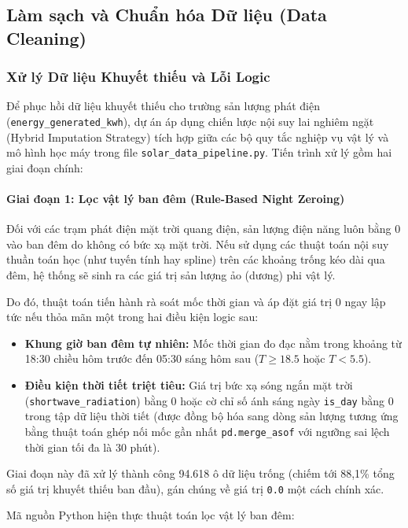 \documentclass[12pt,a4paper]{article}
\begin{document}
\subsection{Làm sạch và Chuẩn hóa Dữ liệu (Data Cleaning)}
\label{sec:cleaning}

\subsubsection{Xử lý Dữ liệu Khuyết thiếu và Lỗi Logic}
\label{subsec:null_imputation}

Để phục hồi dữ liệu khuyết thiếu cho trường sản lượng phát điện (\texttt{energy\_generated\_kwh}), dự án áp dụng chiến lược nội suy lai nghiêm ngặt (Hybrid Imputation Strategy) tích hợp giữa các bộ quy tắc nghiệp vụ vật lý và mô hình học máy trong file \texttt{solar\_data\_pipeline.py}. Tiến trình xử lý gồm hai giai đoạn chính:

\paragraph{Giai đoạn 1: Lọc vật lý ban đêm (Rule-Based Night Zeroing)}
Đối với các trạm phát điện mặt trời quang điện, sản lượng điện năng luôn bằng 0 vào ban đêm do không có bức xạ mặt trời. Nếu sử dụng các thuật toán nội suy thuần toán học (như tuyến tính hay spline) trên các khoảng trống kéo dài qua đêm, hệ thống sẽ sinh ra các giá trị sản lượng ảo (dương) phi vật lý. 

Do đó, thuật toán tiến hành rà soát mốc thời gian và áp đặt giá trị 0 ngay lập tức nếu thỏa mãn một trong hai điều kiện logic sau:
\begin{itemize}
    \item \textbf{Khung giờ ban đêm tự nhiên:} Mốc thời gian đo đạc nằm trong khoảng từ 18:30 chiều hôm trước đến 05:30 sáng hôm sau ($T \ge 18.5$ hoặc $T < 5.5$).
    \item \textbf{Điều kiện thời tiết triệt tiêu:} Giá trị bức xạ sóng ngắn mặt trời (\texttt{shortwave\_radiation}) bằng 0 hoặc cờ chỉ số ánh sáng ngày \texttt{is\_day} bằng 0 trong tập dữ liệu thời tiết (được đồng bộ hóa sang dòng sản lượng tương ứng bằng thuật toán ghép nối mốc gần nhất \texttt{pd.merge\_asof} với ngưỡng sai lệch thời gian tối đa là 30 phút).
\end{itemize}
Giai đoạn này đã xử lý thành công 94.618 ô dữ liệu trống (chiếm tới 88,1\% tổng số giá trị khuyết thiếu ban đầu), gán chúng về giá trị \texttt{0.0} một cách chính xác.

Mã nguồn Python hiện thực thuật toán lọc vật lý ban đêm:
\end{document}
